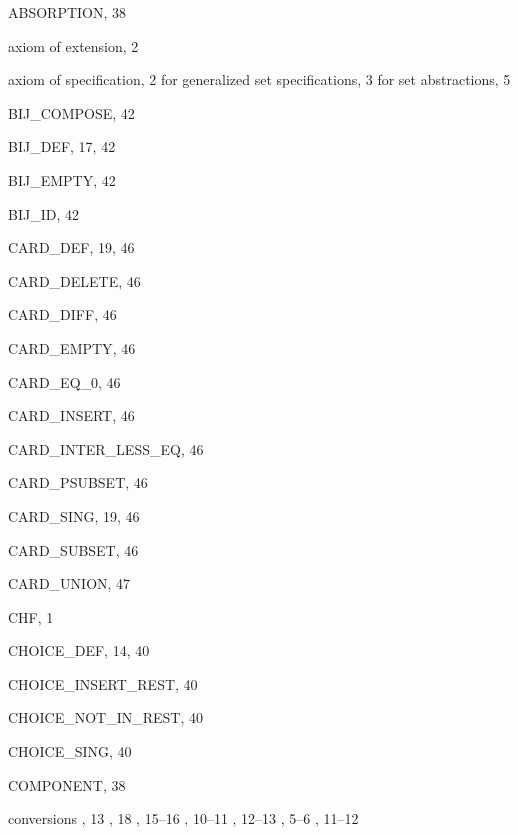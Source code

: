 \begin{theindex}

  \item {\ptt ABSORPTION}, 38
  \item axiom of extension, 2
  \item axiom of specification, 2
    \subitem for generalized set specifications, 3
    \subitem for set abstractions, 5

  \indexspace

  \item {\ptt BIJ\_COMPOSE}, 42
  \item {\ptt BIJ\_DEF}, 17, 42
  \item {\ptt BIJ\_EMPTY}, 42
  \item {\ptt BIJ\_ID}, 42

  \indexspace

  \item {\ptt CARD\_DEF}, 19, 46
  \item {\ptt CARD\_DELETE}, 46
  \item {\ptt CARD\_DIFF}, 46
  \item {\ptt CARD\_EMPTY}, 46
  \item {\ptt CARD\_EQ\_0}, 46
  \item {\ptt CARD\_INSERT}, 46
  \item {\ptt CARD\_INTER\_LESS\_EQ}, 46
  \item {\ptt CARD\_PSUBSET}, 46
  \item {\ptt CARD\_SING}, 19, 46
  \item {\ptt CARD\_SUBSET}, 46
  \item {\ptt CARD\_UNION}, 47
  \item {\ptt CHF}, 1
  \item {\ptt CHOICE\_DEF}, 14, 40
  \item {\ptt CHOICE\_INSERT\_REST}, 40
  \item {\ptt CHOICE\_NOT\_IN\_REST}, 40
  \item {\ptt CHOICE\_SING}, 40
  \item {\ptt COMPONENT}, 38
  \item conversions
    , 13
    , 18
    , 15--16
    , 10--11
    , 12--13
    , 5--6
    , 11--12

  \indexspace


\end{theindex}
